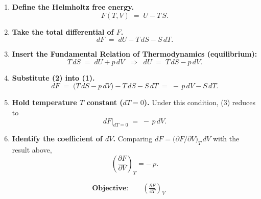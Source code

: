 \documentclass[12pt]{article}
\theoremstyle{definition} %
\theoremstyle{plain} %
\begin{document}
    \begin{enumerate}
    \item \textbf{Define the Helmholtz free energy.}
          \[
            F(T,V) \;=\; U - T\,S .
          \]
    
    \item \textbf{Take the total differential of \(F\).}
          \[
            dF
            \;=\;
            dU - T\,dS - S\,dT .
            \tag{1}
          \]
    
    \item \textbf{Insert the Fundamental Relation of Thermodynamics (equilibrium):}
          \[
            T\,dS \;=\; dU + p\,dV
            \;\;\Longrightarrow\;\;
            dU \;=\; T\,dS - p\,dV .
            \tag{2}
          \]
    
    \item \textbf{Substitute (2) into (1).}
          \[
            dF
            \;=\;
            \bigl(T\,dS - p\,dV\bigr) - T\,dS - S\,dT
            \;=\;
            -\,p\,dV - S\,dT .
            \tag{3}
          \]
    
    \item \textbf{Hold temperature \(T\) constant (\(dT = 0\)).}
          Under this condition, (3) reduces to
          \[
            dF\big|_{dT=0} \;=\; -\,p\,dV .
          \]
    
    \item \textbf{Identify the coefficient of \(dV\).}
          Comparing \(dF = \bigl(\partial F/\partial V\bigr)_T\,dV\) with the result above,
          \[
            \boxed{\displaystyle
              \left(\frac{\partial F}{\partial V}\right)_T = -\,p }.
          \]
    \end{enumerate}
    \begin{align*}
      \textbf{Objective:}\qquad 
      \left(\frac{\partial F}{\partial T}\right)_V
      \end{align*}
      
\end{document}
